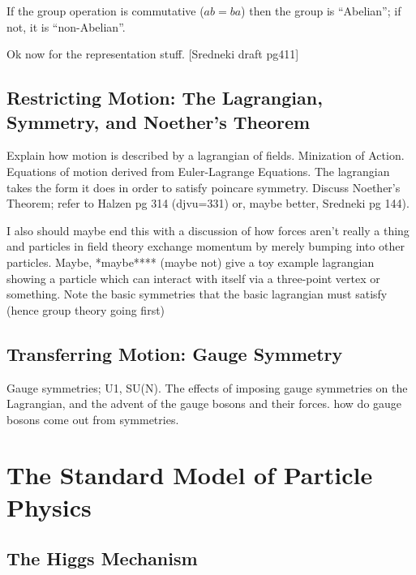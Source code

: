         If the group operation is commutative ($ab=ba$) then the group is ``Abelian''; if not, it is ``non-Abelian''.

        Ok now for the representation stuff. [Sredneki draft pg411]

        \cite{Cheng_book}

    \subsection{Restricting Motion: The Lagrangian, Symmetry, and Noether's Theorem}

       Explain how motion is described by a lagrangian of fields. 
       Minization of Action.
       Equations of motion derived from Euler-Lagrange Equations.
       The lagrangian takes the form it does in order to satisfy poincare symmetry.
       Discuss Noether's Theorem; refer to Halzen pg 314 (djvu=331) or, maybe better, Sredneki pg 144).

       I also should maybe end this with a discussion of how forces aren't really a thing
            and particles in field theory exchange momentum by merely bumping into other particles.
       Maybe, *maybe**** (maybe not) give a toy example lagrangian showing a particle which can interact with itself via a three-point vertex or something.
       Note the basic symmetries that the basic lagrangian must satisfy (hence group theory going first)


    \subsection{Transferring Motion: Gauge Symmetry}

        Gauge symmetries; U1, SU(N).
        The effects of imposing gauge symmetries on the Lagrangian, and the advent of the gauge bosons and their forces.
        how do gauge bosons come out from symmetries.

        \cite{Halzen_book}


        

\section{The Standard Model of Particle Physics}
    \subsection{The Higgs Mechanism}

